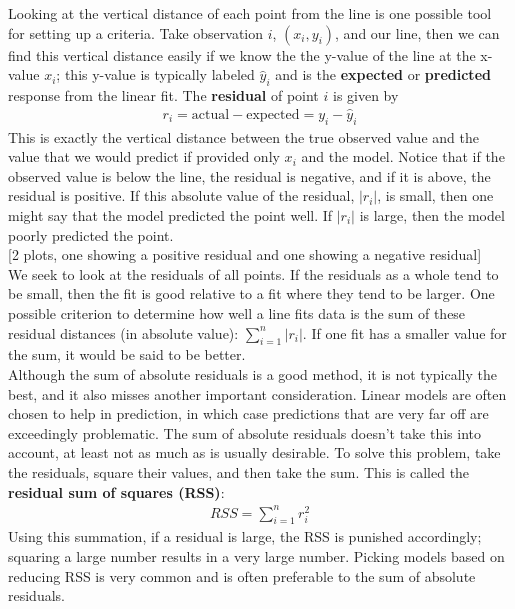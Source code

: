 Looking at the vertical distance of each point from the line is one possible tool for setting up a criteria. Take observation $i$, $(x_i,y_i)$, and our line, then we can find this vertical distance easily if we know the the y-value of the line at the x-value $x_i$; this y-value is typically labeled $\hat{y}_i$ and is the \textbf{expected} or \textbf{predicted} response from the linear fit. The \textbf{residual} of point $i$ is given by
\begin{eqnarray*}
r_i = \text{actual} - \text{expected} = y_i - \hat{y}_i
\end{eqnarray*}
This is exactly the vertical distance between the true observed value and the value that we would predict if provided only $x_i$ and the model. Notice that if the observed value is below the line, the residual is negative, and if it is above, the residual is positive. If this absolute value of the residual, $|r_i|$, is small, then one might say that the model predicted the point well. If $|r_i|$ is large, then the model poorly predicted the point. \\

[2 plots, one showing a positive residual and one showing a negative residual] \\

We seek to look at the residuals of all points. If the residuals as a whole tend to be small, then the fit is good relative to a fit where they tend to be larger. One possible criterion to determine how well a line fits data is the sum of these residual distances (in absolute value): $\sum_{i=1}^n |r_i|$. If one fit has a smaller value for the sum, it would be said to be better. \\

Although the sum of absolute residuals is a good method, it is not typically the best, and it also misses another important consideration. Linear models are often chosen to help in prediction, in which case predictions that are very far off are exceedingly problematic. The sum of absolute residuals doesn't take this into account, at least not as much as is usually desirable. To solve this problem, take the residuals, square their values, and then take the sum. This is called the \textbf{residual sum of squares (RSS)}:
\begin{eqnarray*}
RSS = \sum_{i=1}^n r_i^2
\end{eqnarray*}
Using this summation, if a residual is large, the RSS is punished accordingly; squaring a large number results in a very large number. Picking models based on reducing RSS is very common and is often preferable to the sum of absolute residuals. \\

